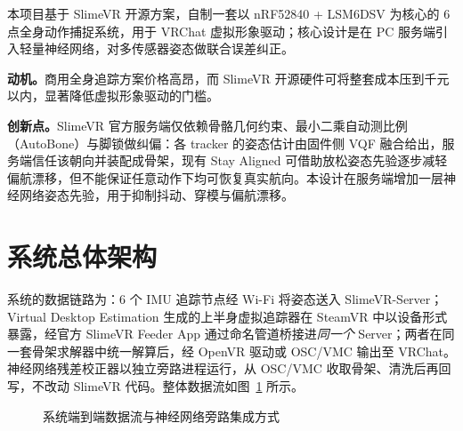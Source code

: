 \documentclass[scheme=plain,UTF8,11pt,a4paper]{ctexart}
\begin{document}
本项目基于 SlimeVR 开源方案，自制一套以 nRF52840 + LSM6DSV 为核心的 6 点全身动作捕捉系统，用于 VRChat 虚拟形象驱动；核心设计是在 PC 服务端引入轻量神经网络，对多传感器姿态做联合误差纠正。

\textbf{动机。}商用全身追踪方案价格高昂，而 SlimeVR 开源硬件可将整套成本压到千元以内，显著降低虚拟形象驱动的门槛。

\textbf{创新点。}SlimeVR 官方服务端仅依赖骨骼几何约束、最小二乘自动测比例（AutoBone）与脚锁做纠偏：各 tracker 的姿态估计由固件侧 VQF 融合给出，服务端信任该朝向并装配成骨架，现有 Stay Aligned 可借助放松姿态先验逐步减轻偏航漂移，但不能保证任意动作下均可恢复真实航向。本设计在服务端增加一层神经网络姿态先验，用于抑制抖动、穿模与偏航漂移。

\section{系统总体架构}
\label{sec:arch}

系统的数据链路为：6 个 IMU 追踪节点经 Wi-Fi 将姿态送入 SlimeVR-Server；Virtual Desktop Estimation 生成的上半身虚拟追踪器在 SteamVR 中以设备形式暴露，经官方 SlimeVR Feeder App 通过命名管道桥接进\emph{同一个} Server；两者在同一套骨架求解器中统一解算后，经 OpenVR 驱动或 OSC/VMC 输出至 VRChat。神经网络残差校正器以独立旁路进程运行，从 OSC/VMC 收取骨架、清洗后再回写，不改动 SlimeVR 代码。整体数据流如图~\ref{fig:pipeline} 所示。

\begin{figure}[H]
\centering
{}
\caption{系统端到端数据流与神经网络旁路集成方式}
\label{fig:pipeline}
\end{figure}
\end{document}
